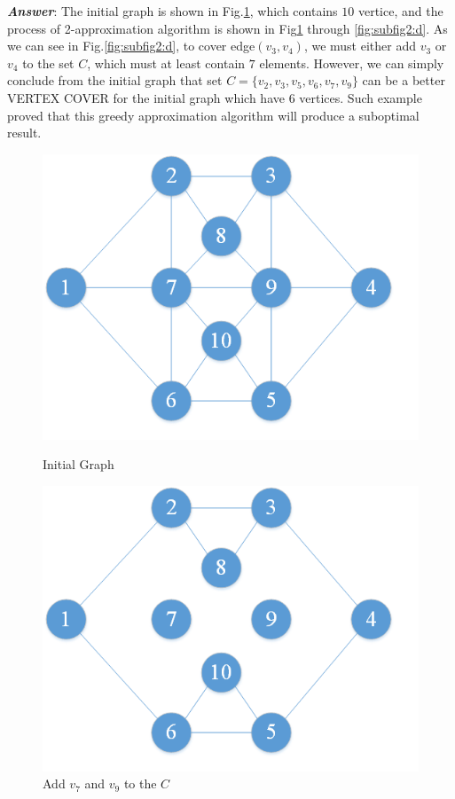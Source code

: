 \documentclass[11pt]{article}
\begin{document}
\noindent \textbf{\emph{Answer}}:
The initial graph is shown in Fig.\ref{fig:subfig2:a}, which contains $10$ vertice, and the process of 2-approximation algorithm is shown in Fig\ref{fig:subfig2:a} through \ref{fig:subfig2:d}. As we can see in Fig.\ref{fig:subfig2:d}, to cover edge$(v_3,v_4)$, we must either add $v_3$ or $v_4$ to the set $C$, which must at least contain $7$ elements. However, we can simply conclude from the initial graph that set $C=\{v_2,v_3,v_5,v_6,v_7,v_9\}$ can be a better VERTEX COVER for the initial graph which have $6$ vertices. Such example proved that this greedy approximation algorithm will produce a suboptimal result.
\begin{figure}[H]
	\begin{minipage}[t]{0.50\linewidth}
		\centering
		\includegraphics[width=0.75\linewidth]{Figure/1b1.png}
		\caption{Initial Graph}
		\label{fig:subfig2:a}
	\end{minipage}
	\begin{minipage}[t]{0.50\linewidth}
		\centering
		\includegraphics[width=0.75\linewidth]{Figure/1b2.png}
		\caption{Add $v_7$ and $v_9$ to the $C$}

\end{minipage}
\end{figure}
\end{document}
